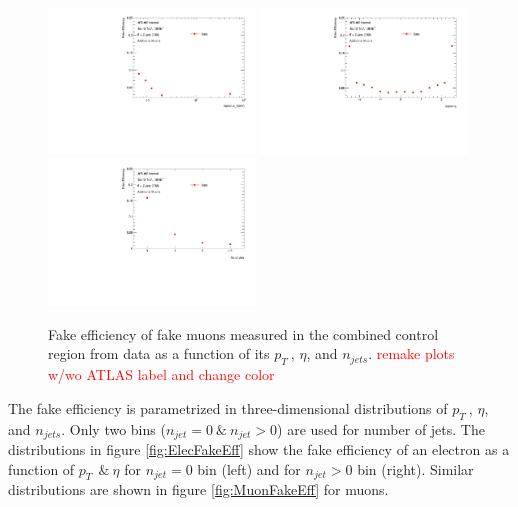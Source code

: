 \begin{figure}[htb]
        \begin{center}
        \includegraphics[width = 0.49\textwidth]{figures/Analysis/Background/Fake_Eff_Muon_pt_1D.pdf}
        \includegraphics[width = 0.49\textwidth]{figures/Analysis/Background/Fake_Eff_Muon_eta_1D.pdf} \\
        \includegraphics[width = 0.49\textwidth]{figures/Analysis/Background/Fake_Eff_Muon_jet_n_1D.pdf} 
        \end{center}
    \caption{Fake efficiency of fake muons measured in the combined control region from data as a function of its $p_{T}~$, $\eta$, and $n_{jets}$. \textcolor{red}{remake plots w/wo ATLAS label and change color} \label{fig:FakeEff_1D_Muon}}
\end{figure}

The fake efficiency is parametrized in three-dimensional distributions of $p_{T}~$, $\eta$, and $n_{jets}$. Only two bins ($n_{jet}=0 ~\& ~ n_{jet} > 0$) are used for number of jets. The distributions in figure \ref{fig:ElecFakeEff} show the fake efficiency of an electron as a function of $p_{T}~ ~\&~ \eta$ for $n_{jet}=0 $ bin (left) and for $n_{jet}>0 $ bin (right). Similar distributions are shown in figure \ref{fig:MuonFakeEff} for muons.  

